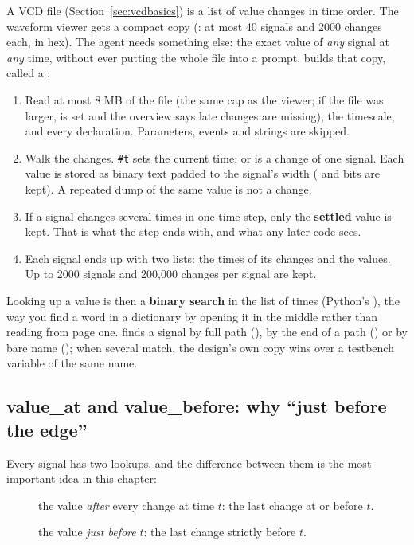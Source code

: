 A VCD file (Section~\ref{sec:vcdbasics}) is a list of value changes in time order. The waveform viewer gets a compact copy (: at most 40 signals and 2000 changes each, in hex). The agent needs something else: the exact value of \emph{any} signal at \emph{any} time, without ever putting the whole file into a prompt.  builds that copy, called a :

\begin{enumerate}
  \item Read at most 8 MB of the file (the same cap as the viewer; if the file was larger,  is set and the overview says late changes are missing), the timescale, and every  declaration. Parameters, events and strings are skipped.
  \item Walk the changes. \texttt{\#t} sets the current time;  or  is a change of one signal. Each value is stored as binary text padded to the signal's width ( and  bits are kept). A repeated dump of the same value is not a change.
  \item If a signal changes several times in one time step, only the \textbf{settled} value is kept. That is what the step ends with, and what any later code sees.
  \item Each signal ends up with two lists: the times of its changes and the values. Up to 2000 signals and 200,000 changes per signal are kept.
\end{enumerate}

Looking up a value is then a \textbf{binary search} in the list of times (Python's ), the way you find a word in a dictionary by opening it in the middle rather than reading from page one.  finds a signal by full path (), by the end of a path () or by bare name (); when several match, the design's own copy wins over a testbench variable of the same name.

\subsection{value\_at and value\_before: why ``just before the edge''}

Every signal has two lookups, and the difference between them is the most important idea in this chapter:
\begin{description}
  \item[] the value \emph{after} every change at time $t$: the last change at or before $t$.
  \item[] the value \emph{just before} $t$: the last change strictly before $t$.
\end{description}

